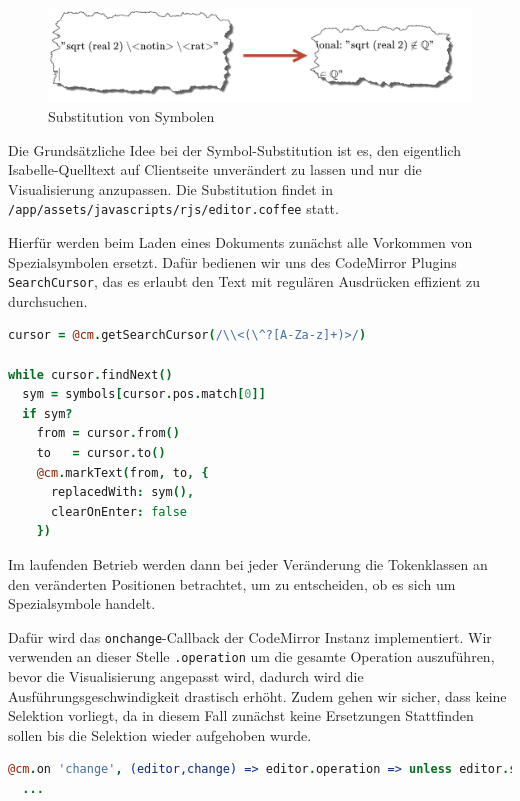 \begin{figure}[ht]
\includegraphics[width=\linewidth]{images/subst}
  \caption{Substitution von Symbolen}
  \label{fig:subst}
\end{figure}

Die Grundsätzliche Idee bei der Symbol-Substitution ist es, den eigentlich Isabelle-Quelltext auf
Clientseite unverändert zu lassen und nur die Visualisierung anzupassen. Die Substitution findet in
\texttt{/app/assets/javascripts/rjs/editor.coffee} statt.

Hierfür werden beim Laden eines Dokuments zunächst alle Vorkommen von Spezialsymbolen ersetzt. Dafür
bedienen wir uns des CodeMirror Plugins \texttt{SearchCursor}, das es erlaubt den Text mit regulären
Ausdrücken effizient zu durchsuchen.

\begin{lstlisting}[language=coffee]
cursor = @cm.getSearchCursor(/\\<(\^?[A-Za-z]+)>/)

while cursor.findNext()
  sym = symbols[cursor.pos.match[0]]
  if sym?
    from = cursor.from()
    to   = cursor.to()
    @cm.markText(from, to, {
      replacedWith: sym(),
      clearOnEnter: false
    })
\end{lstlisting}

Im laufenden Betrieb werden dann bei jeder Veränderung die Tokenklassen an den veränderten
Positionen betrachtet, um zu entscheiden, ob es sich um Spezialsymbole handelt.

Dafür wird das \texttt{onchange}-Callback der CodeMirror Instanz implementiert. Wir verwenden an
dieser Stelle \texttt{.operation} um die gesamte Operation auszuführen, bevor die Visualisierung
angepasst wird, dadurch wird die Ausführungsgeschwindigkeit drastisch erhöht. Zudem gehen wir
sicher, dass keine Selektion vorliegt, da in diesem Fall zunächst keine Ersetzungen Stattfinden
sollen bis die Selektion wieder aufgehoben wurde.

\begin{lstlisting}[language=coffee]
@cm.on 'change', (editor,change) => editor.operation => unless editor.somethingSelected()
  ...
\end{lstlisting}

